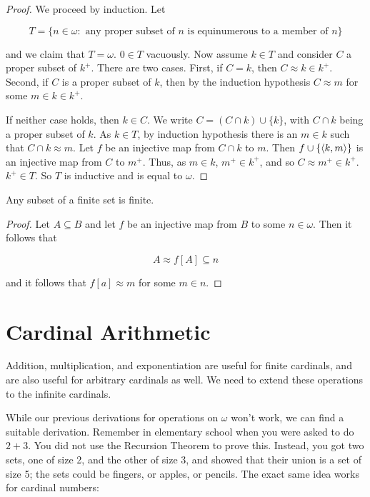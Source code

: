 \begin{proof}
    We proceed by induction. Let 
    
    \[T = \{n \in \omega : \text{ any proper subset of $n$ is equinumerous to a member of $n$}\}\] 
    
    and we claim that $T = \omega$. $0 \in T$ vacuously. Now assume $k \in T$ and consider $C$ a proper subset of $k^+$. There are two cases. First, if $C = k$, then $C \approx k \in k^+$. Second, if $C$ is a proper subset of $k$, then by the induction hypothesis $C \approx m$ for some $m \in k \in k^+$. 

    If neither case holds, then $k \in C$. We write $C = (C \cap k) \cup \{k\}$, with $C \cap k$ being a proper subset of $k$. As $k \in T$, by induction hypothesis there is an $m \in k$ such that $C \cap k \approx m$. Let $f$ be an injective map from $C \cap k$ to $m$. Then $f \cup \{\left\langle k,m \right\rangle\}$ is an injective map from $C$ to $m^+$. Thus, as $m \in k$, $m^+ \in k^+$, and so $C \approx m^+ \in k^+$. $k^+ \in T$. So $T$ is inductive and is equal to $\omega$. 
\end{proof}

\begin{corollary}
    Any subset of a finite set is finite.
\end{corollary}

\begin{proof}
    Let $A \subseteq B$ and let $f$ be an injective map from $B$ to some $n \in \omega$. Then it follows that

    \[A \approx f[A] \subseteq n\]

    and it follows that $f[a] \approx m$ for some $m \in n$. 
\end{proof}

\section{Cardinal Arithmetic}

Addition, multiplication, and exponentiation are useful for finite cardinals, and are also useful for arbitrary cardinals as well. We need to extend these operations to the infinite cardinals.

While our previous derivations for operations on $\omega$ won't work, we can find a suitable derivation. Remember in elementary school when you were asked to do $2 + 3$. You did not use the Recursion Theorem to prove this. Instead, you got two sets, one of size 2, and the other of size 3, and showed that their union is a set of size 5; the sets could be fingers, or apples, or pencils. The exact same idea works for cardinal numbers:

